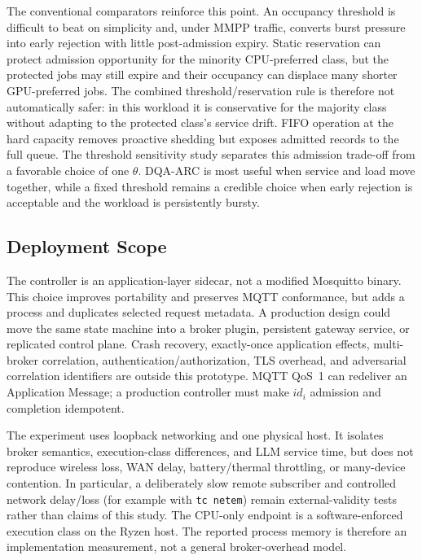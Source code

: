 \documentclass[journal]{IEEEtran}
\newcommand{\method}{DQA-ARC}
\begin{document}
The conventional comparators reinforce this point. An occupancy threshold is difficult to beat on simplicity and, under MMPP traffic, converts burst pressure into early rejection with little post-admission expiry. Static reservation can protect admission opportunity for the minority CPU-preferred class, but the protected jobs may still expire and their occupancy can displace many shorter GPU-preferred jobs. The combined threshold/reservation rule is therefore not automatically safer: in this workload it is conservative for the majority class without adapting to the protected class's service drift. FIFO operation at the hard capacity removes proactive shedding but exposes admitted records to the full queue. The threshold sensitivity study separates this admission trade-off from a favorable choice of one $\theta$. \method{} is most useful when service and load move together, while a fixed threshold remains a credible choice when early rejection is acceptable and the workload is persistently bursty.

\subsection{Deployment Scope}

The controller is an application-layer sidecar, not a modified Mosquitto binary. This choice improves portability and preserves MQTT conformance, but adds a process and duplicates selected request metadata. A production design could move the same state machine into a broker plugin, persistent gateway service, or replicated control plane. Crash recovery, exactly-once application effects, multi-broker correlation, authentication/authorization, TLS overhead, and adversarial correlation identifiers are outside this prototype. MQTT QoS~1 can redeliver an Application Message; a production controller must make $id_i$ admission and completion idempotent.

The experiment uses loopback networking and one physical host. It isolates broker semantics, execution-class differences, and LLM service time, but does not reproduce wireless loss, WAN delay, battery/thermal throttling, or many-device contention. In particular, a deliberately slow remote subscriber and controlled network delay/loss (for example with \texttt{tc netem}) remain external-validity tests rather than claims of this study. The CPU-only endpoint is a software-enforced execution class on the Ryzen host. The reported process memory is therefore an implementation measurement, not a general broker-overhead model.
\end{document}
